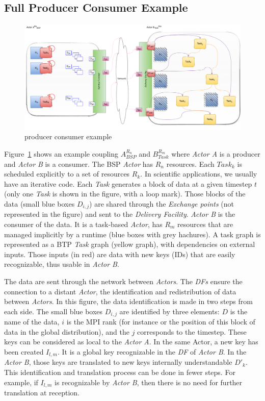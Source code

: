 \subsection{Full Producer Consumer Example}\label{sec:btp:FullPCExample}

 
\begin{figure}[tb]\centering
\includegraphics[width=\columnwidth]{figures/BTP.pdf}
\caption{producer consumer example}
\label{figBTP}
\end{figure}

Figure~\ref{figBTP} shows an example coupling $A_{BSP}^{R_{n}}$ and $B_{Task}^{R_{m}}$ where \textit{Actor A} is a producer and \textit{Actor B} is a consumer. The BSP \textit{Actor} has $R_{n}$ resources. Each $Task_k$ is scheduled explicitly to a set of resources $R_{k}$. In scientific applications, we usually have an iterative code. Each \textit{Task} generates a block of data at a given timestep $t$ (only one \textit{Task} is shown in the figure, with a loop mark). Those blocks of the data (small blue boxes $D_{i,j}$) are shared through the \textit{Exchange points} (not represented in the figure) and sent to the \textit{Delivery Facility}.
\textit{Actor B} is the consumer of the data. It is a task-based \textit{Actor}, has $R_{m}$ resources that are managed implicitly by a runtime (blue boxes with grey hachures). A task graph is represented as a BTP \textit{Task} graph (yellow graph), with dependencies on external inputs. Those inputs (in red) are data with new keys (IDs) that are easily recognizable, thus usable in \textit{Actor B}.  

The data are sent through the network between \textit{Actors}. The \textit{DFs} ensure the connection to a distant \textit{Actor}, the identification and redistribution of data between \textit{Actors}. 
In this figure, the data identification is made in two steps from each side. The small blue boxes $D_{i,j}$ are identified by three elements: $D$ is the name of the data, $i$ is the MPI rank (for instance or the position of this block of data in the global distribution), and the $j$ corresponds to the timestep. These keys can be considered as local to the \textit{Actor A}. 
In the same Actor, a new key has been created $I_{l,m}$. It is a global key recognizable in the \textit{DF} of \textit{Actor B}. In the \textit{Actor B}, those keys are translated to new keys internally understandable $D'_{k}$. 
This identification and translation process can be done in fewer steps. For example, if $I_{l,m}$ is recognizable by \textit{Actor B}, then there is no need for further translation at reception.

